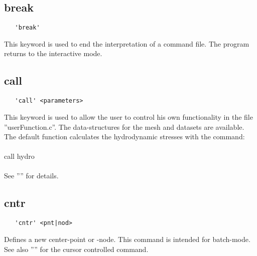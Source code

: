 \documentclass{article}
\begin{document}
\subsection{\label{break}break}
\begin{verbatim}
   'break'
\end{verbatim}
This keyword is used to end the interpretation of a command file. The program returns to the interactive mode.

\subsection{\label{call}call}
\begin{verbatim}
   'call' <parameters>
\end{verbatim}
This keyword is used to allow the user to control his own functionality in the file ''userFunction.c''. The data-structures for the mesh and datasets are available. The default function calculates the hydrodynamic stresses with the command:\\\\call hydro\\\\See '''' for  details. 

\subsection{\label{cntr}cntr}
\begin{verbatim}
   'cntr' <pnt|nod>
\end{verbatim}
Defines a new center-point or -node. This command is intended for batch-mode. See also '''' for the cursor controlled command.
\end{document}
